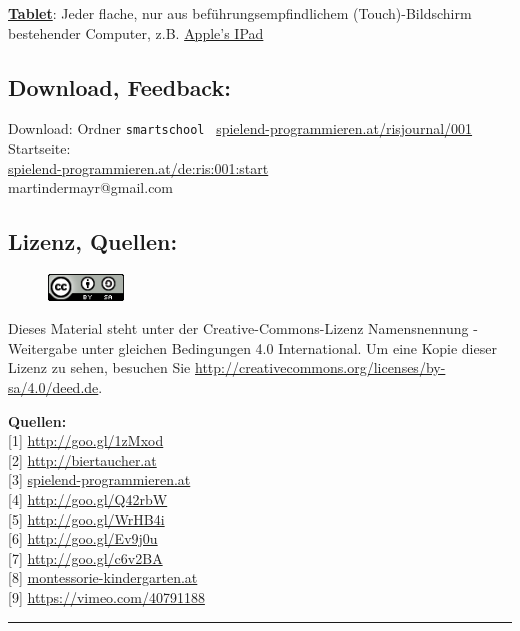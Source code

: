 \documentclass[10pt,a4paper,ngerman,twoside]{article} %
\newcommand{\SepRule}{\noindent	%
\begin{center}
\rule{250pt}{1pt} %
\end{center}
}
\begin{document}
\begin{multicols}{3}
\href{https://de.wikipedia.org/wiki/Tablet-Computer}{\textbf{Tablet}}: Jeder flache, nur aus beführungsempfindlichem (Touch)-Bildschirm bestehender Computer, z.B. \href{https://de.wikipedia.org/wiki/Apple_iPad}{Apple's IPad}


\subsection*{Download, Feedback:}
\footnotesize{
Download: Ordner \texttt{smartschool} \Mundus\ \href{http://spielend-programmieren.at/risjournal/001}{spielend-programmieren.at/risjournal/001}\\
Startseite:\\
\href{http://spielend-programmieren.at/de:ris:001:start}{spielend-programmieren.at/de:ris:001:start}\\ 
\Letter\: martindermayr@gmail.com\\}
\normalsize 

\subsection*{Lizenz, Quellen:}
\begin{figure}
\includegraphics[width=2cm]{smartschool/ccbysa88x31.png}
\end{figure}
Dieses Material steht unter der Creative-Commons-Lizenz Namensnennung - Weitergabe unter gleichen Bedingungen 4.0 International. Um eine Kopie dieser Lizenz zu sehen, besuchen Sie \url{http://creativecommons.org/licenses/by-sa/4.0/deed.de}.

\textbf{Quellen:} \\
{[}1{]} \url{http://goo.gl/1zMxod} \\
{[}2{]} \url{http://biertaucher.at} \\
{[}3{]} \href{http://spielend-programmieren.at}{spielend-programmieren.at} \\
{[}4{]} \url{http://goo.gl/Q42rbW} \\
{[}5{]} \url{http://goo.gl/WrHB4i} \\
{[}6{]} \url{http://goo.gl/Ev9j0u} \\
{[}7{]} \url{http://goo.gl/c6v2BA} \\
{[}8{]} \href{http://www.montessori-kindergarten.at/}{montessorie-kindergarten.at} \\
{[}9{]} \url{https://vimeo.com/40791188} 



\end{multicols} %
\SepRule
\end{document}
